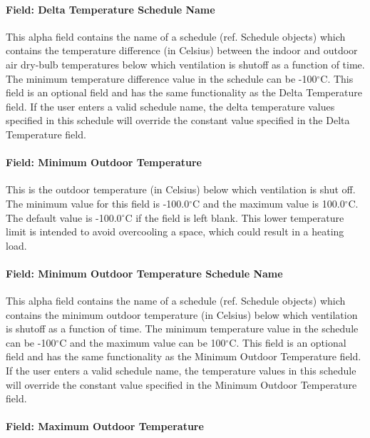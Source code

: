 \paragraph{Field: Delta Temperature Schedule Name}\label{field-delta-temperature-schedule-name}

This alpha field contains the name of a schedule (ref. Schedule objects) which contains the temperature difference (in Celsius) between the indoor and outdoor air dry-bulb temperatures below which ventilation is shutoff as a function of time. The minimum temperature difference value in the schedule can be -100$^\circ$C. This field is an optional field and has the same functionality as the Delta Temperature field. If the user enters a valid schedule name, the delta temperature values specified in this schedule will override the constant value specified in the Delta Temperature field.

\paragraph{Field: Minimum Outdoor Temperature}\label{field-minimum-outdoor-temperature}

This is the outdoor temperature (in Celsius) below which ventilation is shut off. The minimum value for this field is -100.0$^\circ$C and the maximum value is 100.0$^\circ$C. The default value is -100.0$^\circ$C if the field is left blank. This lower temperature limit is intended to avoid overcooling a space, which could result in a heating load.

\paragraph{Field: Minimum Outdoor Temperature Schedule Name}\label{field-minimum-outdoor-temperature-schedule-name}

This alpha field contains the name of a schedule (ref. Schedule objects) which contains the minimum outdoor temperature (in Celsius) below which ventilation is shutoff as a function of time. The minimum temperature value in the schedule can be -100$^\circ$C and the maximum value can be 100$^\circ$C. This field is an optional field and has the same functionality as the Minimum Outdoor Temperature field. If the user enters a valid schedule name, the temperature values in this schedule will override the constant value specified in the Minimum Outdoor Temperature field.

\paragraph{Field: Maximum Outdoor Temperature}\label{field-maximum-outdoor-temperature}

